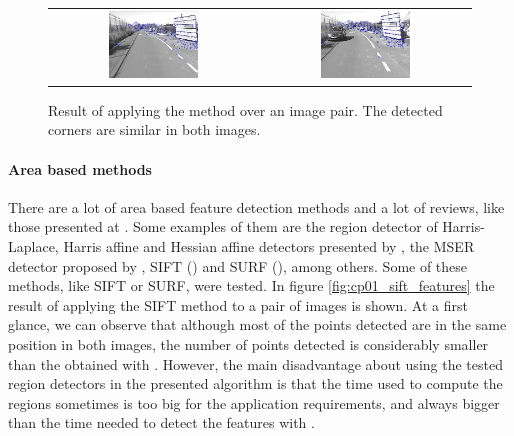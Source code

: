 \begin{figure}[h!]
\begin{tabular}{cc}
\includegraphics[width=0.45\textwidth]{featuresShi1}\label{fig:cp01_features_shi_1} &
\includegraphics[width=0.45\textwidth]{featuresShi2}\label{fig:cp01_features_shi_2}
\end{tabular}
\caption{Result of applying the \cite{shi1994good} method over an image pair. The detected corners are similar in both images.}\label{fig:cp01_shi_tomasi_features}
\end{figure}

\paragraph{Area based methods}\label{ch:chapter01_01_02_01_02}

There are a lot of area based feature detection methods and a lot of reviews, like those presented at \cite{mikolajczyk2005comparison, li2008comprehensive}. Some examples of them are the region detector of Harris-Laplace, Harris affine and Hessian affine detectors presented by \cite{mikolajczyk2004scale}, the MSER detector proposed by \cite{matas2004robust}, SIFT (\cite{lowe1999object}) and SURF (\cite{bay2008speeded}), among others. Some of these methods, like SIFT or SURF, were tested. In figure \ref{fig:cp01_sift_features} the result of applying the SIFT method to a pair of images is shown. At a first glance, we can observe that although most of the points detected are in the same position in both images, the number of points detected is considerably smaller than the obtained with \cite{shi1994good}. However, the main disadvantage about using the tested region detectors in the presented algorithm is that the time used to compute the regions sometimes is too big for the application requirements, and always bigger than the time needed to detect the features with \cite{shi1994good}.

